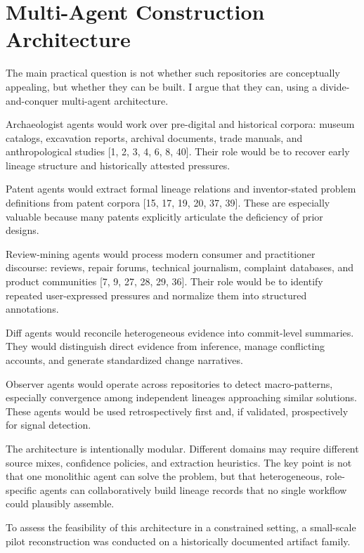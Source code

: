 \documentclass[11pt]{article}
\begin{document}
\section{Multi-Agent Construction Architecture}
The main practical question is not whether such repositories are conceptually appealing, but whether they can be built. I argue that they can, using a divide-and-conquer multi-agent architecture.

Archaeologist agents would work over pre-digital and historical corpora: museum catalogs, excavation reports, archival documents, trade manuals, and anthropological studies [1, 2, 3, 4, 6, 8, 40]. Their role would be to recover early lineage structure and historically attested pressures.

Patent agents would extract formal lineage relations and inventor-stated problem definitions from patent corpora [15, 17, 19, 20, 37, 39]. These are especially valuable because many patents explicitly articulate the deficiency of prior designs.

Review-mining agents would process modern consumer and practitioner discourse: reviews, repair forums, technical journalism, complaint databases, and product communities [7, 9, 27, 28, 29, 36]. Their role would be to identify repeated user-expressed pressures and normalize them into structured annotations.

Diff agents would reconcile heterogeneous evidence into commit-level summaries. They would distinguish direct evidence from inference, manage conflicting accounts, and generate standardized change narratives.

Observer agents would operate across repositories to detect macro-patterns, especially convergence among independent lineages approaching similar solutions. These agents would be used retrospectively first and, if validated, prospectively for signal detection.

The architecture is intentionally modular. Different domains may require different source mixes, confidence policies, and extraction heuristics. The key point is not that one monolithic agent can solve the problem, but that heterogeneous, role-specific agents can collaboratively build lineage records that no single workflow could plausibly assemble.

To assess the feasibility of this architecture in a constrained setting, a small-scale pilot reconstruction was conducted on a historically documented artifact family.
\end{document}
